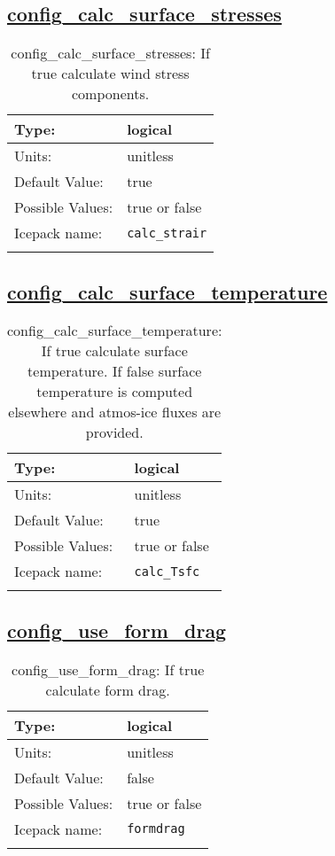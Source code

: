 \subsection[config\_calc\_surface\_stresses]{\hyperref[sec:nm_tab_atmosphere]{config\_calc\_surface\_stresses}}
\label{subsec:nm_sec_config_calc_surface_stresses}
\begin{center}
\begin{longtable}{| p{2.0in} || p{4.0in} |}
    \hline
    Type: & logical \\
    \hline
    Units: & \si{unitless} \\
    \hline
    Default Value: & true \\
    \hline
    Possible Values: & true or false \\
    \hline
    \hline
    Icepack name: & \verb+calc_strair+ \\
    \caption{config\_calc\_surface\_stresses: If true calculate wind stress components.}
\end{longtable}
\end{center}
\subsection[config\_calc\_surface\_temperature]{\hyperref[sec:nm_tab_atmosphere]{config\_calc\_surface\_temperature}}
\label{subsec:nm_sec_config_calc_surface_temperature}
\begin{center}
\begin{longtable}{| p{2.0in} || p{4.0in} |}
    \hline
    Type: & logical \\
    \hline
    Units: & \si{unitless} \\
    \hline
    Default Value: & true \\
    \hline
    Possible Values: & true or false \\
    \hline
    \hline
    Icepack name: & \verb+calc_Tsfc+ \\
    \caption{config\_calc\_surface\_temperature: If true calculate surface temperature. If false surface temperature is computed elsewhere and atmos-ice fluxes are provided.}
\end{longtable}
\end{center}
\subsection[config\_use\_form\_drag]{\hyperref[sec:nm_tab_atmosphere]{config\_use\_form\_drag}}
\label{subsec:nm_sec_config_use_form_drag}
\begin{center}
\begin{longtable}{| p{2.0in} || p{4.0in} |}
    \hline
    Type: & logical \\
    \hline
    Units: & \si{unitless} \\
    \hline
    Default Value: & false \\
    \hline
    Possible Values: & true or false \\
    \hline
    \hline
    Icepack name: & \verb+formdrag+ \\
    \caption{config\_use\_form\_drag: If true calculate form drag.}
\end{longtable}
\end{center}

